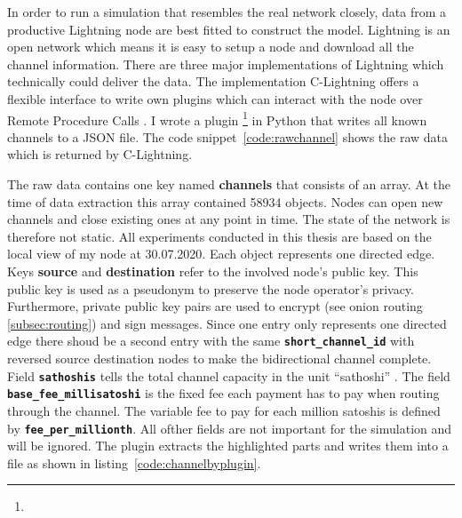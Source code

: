 \documentclass[final]{fhnwreport}       %
\begin{document}
In order to run a simulation that resembles the real network closely, data from a productive Lightning node are best fitted to construct the model. Lightning is an open network which means it is easy to setup a node and download all the channel information. There are three major implementations of Lightning which technically could deliver the data. The implementation C-Lightning offers a flexible interface to write own plugins which can interact with the node over Remote Procedure Calls . I wrote a plugin \footnote{\gitpluginurl} in Python that writes all known channels to a JSON file. The code snippet~\ref{code:rawchannel} shows the raw data which is returned by C-Lightning. 


The raw data contains one key named \textbf{channels} that consists of an array. At the time of data extraction this array contained 58934 objects. Nodes can open new channels and close existing ones at any point in time. The state of the network is therefore not static. All experiments conducted in this thesis are based on the local view of my node at 30.07.2020. Each object represents one directed edge. Keys \textbf{source} and \textbf{destination} refer to the involved node's public key. This public key is used as a pseudonym to preserve the node operator's privacy. Furthermore, private public key pairs are used to encrypt (see onion routing \ref{subsec:routing}) and sign messages. Since one entry only represents one directed edge there shoud be a second entry with the same \textbf{\texttt{short\_channel\_id}} with reversed source destination nodes to make the bidirectional channel complete. Field \textbf{\texttt{sathoshis}} tells the total channel capacity in the unit ``sathoshi'' . The field \textbf{\texttt{base\_fee\_millisatoshi}} is the fixed fee each payment has to pay when routing through the channel. The variable fee to pay for each million satoshis is defined by \textbf{\texttt{fee\_per\_millionth}}. All ofther fields are not important for the simulation and will be ignored. The plugin extracts the highlighted parts and writes them into a file as shown in listing~\ref{code:channelbyplugin}. 
\end{document}
